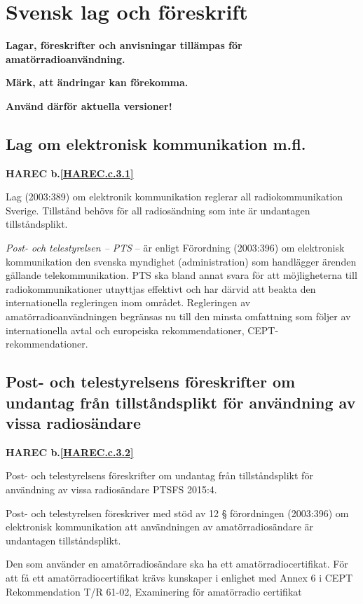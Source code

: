 \section{Svensk lag och föreskrift}

\textbf{Lagar, föreskrifter och anvisningar tillämpas för
  amatörradioanvändning.}

\textbf{Märk, att ändringar kan förekomma.}

\textbf{Använd därför aktuella versioner!}


\subsection{Lag om elektronisk kommunikation m.fl.}
\textbf{
HAREC b.\ref{HAREC.c.3.1}\label{myHAREC.c.3.1}
}

Lag (2003:389) om elektronik kommunikation reglerar all radiokommunikation Sverige. Tillstånd behövs för all radiosändning som inte är undantagen
tillståndsplikt.

\emph{Post- och telestyrelsen -- PTS} -- är enligt Förordning (2003:396) om
elektronisk kommunikation den svenska myndighet (administration) som handlägger
ärenden gällande telekommunikation. PTS ska bland annat svara för att
möjligheterna till radiokommunikationer utnyttjas effektivt och har därvid att
beakta den internationella regleringen inom området. Regleringen av
amatörradioanvändningen begränsas nu till den minsta omfattning som
följer av internationella avtal och europeiska rekommendationer,
CEPT-rekommendationer.

\subsection{Post- och telestyrelsens föreskrifter om undantag från tillståndsplikt för användning av vissa radiosändare}
\textbf{
HAREC b.\ref{HAREC.c.3.2}\label{myHAREC.c.3.2}
}

Post- och telestyrelsens föreskrifter om undantag från tillståndsplikt för
användning av vissa radiosändare PTSFS 2015:4.

Post- och telestyrelsen föreskriver med stöd av 12 § förordningen (2003:396)
om elektronisk kommunikation att användningen av amatörradiosändare är
undantagen tillståndsplikt.

Den som använder en amatörradiosändare ska ha ett amatörradiocertifikat. För
att få ett amatörradiocertifikat krävs kunskaper i enlighet med Annex 6 i
CEPT Rekommendation T/R 61-02, Examinering för amatörradio certifikat

